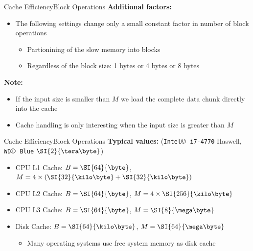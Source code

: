 \begin{frame}{Cache Efficiency}{Block Operations}
  \textbf{Additional factors:}\\
  \begin{itemize}
    \item<2->
    The following settings change only a small constant factor in number of block operations
    \begin{itemize}
    \item<3-> Partionining of the slow memory into blocks
    \item<4-> Regardless of the block size: {\color{MainA}1 bytes} or
      {\color{MainA}4 bytes} or {\color{MainA}8 bytes}
    \end{itemize}
  \end{itemize}
  \vspace{1.0em}
  \textbf{Note:}\\
  \begin{itemize}
    \item<6->
      If the {\color{MainA}input size} is
      {\color{MainA}smaller than $M$} we load the complete data chunk
      directly into the cache
    \item<7->
      Cache handling is only interesting when the
      {\color{MainA}input size} is
      {\color{MainA}greater than $M$}
  \end{itemize}
\end{frame}


\begin{frame}{Cache Efficiency}{Block Operations}
  \textbf{Typical values:}
  (\texttt{Intel$\copyright$ i7-4770} Haswell,
  \texttt{WD$\copyright$ Blue} $\SI{2}{\tera\byte}$)
  \begin{itemize}
    \item<2->
      CPU L1 Cache: {\color{MainA}$B = \SI{64}{\byte}$},
      {\color{MainA}$M = 4 \times (\SI{32}{\kilo\byte} + \SI{32}{\kilo\byte})$}
    \item<3->
      CPU L2 Cache: {\color{MainA}$B = \SI{64}{\byte}$}, {\color{MainA}$M = 4 \times \SI{256}{\kilo\byte}$}
    \item<4->
      CPU L3 Cache: {\color{MainA}$B = \SI{64}{\byte}$}, {\color{MainA}$M = \SI{8}{\mega\byte}$}
    \item<4->
      Disk Cache: {\color{MainA}$B = \SI{64}{\kilo\byte}$}, {\color{MainA}$M = \SI{64}{\mega\byte}$}
    \begin{itemize}
      \item<5->
        Many operating systems use free system memory as disk cache
    \end{itemize}
  \end{itemize}
\end{frame}

